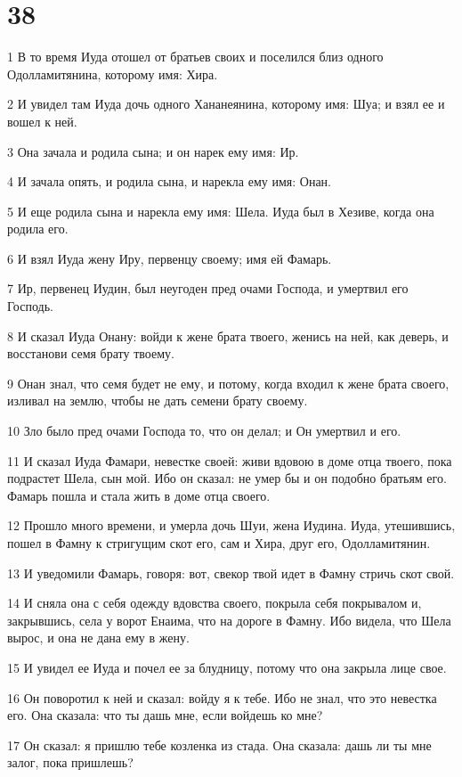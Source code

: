 \chapter{38}

\par 1 В то время Иуда отошел от братьев своих и поселился близ одного Одолламитянина, которому имя: Хира.
\par 2 И увидел там Иуда дочь одного Хананеянина, которому имя: Шуа; и взял ее и вошел к ней.
\par 3 Она зачала и родила сына; и он нарек ему имя: Ир.
\par 4 И зачала опять, и родила сына, и нарекла ему имя: Онан.
\par 5 И еще родила сына и нарекла ему имя: Шела. Иуда был в Хезиве, когда она родила его.
\par 6 И взял Иуда жену Иру, первенцу своему; имя ей Фамарь.
\par 7 Ир, первенец Иудин, был неугоден пред очами Господа, и умертвил его Господь.
\par 8 И сказал Иуда Онану: войди к жене брата твоего, женись на ней, как деверь, и восстанови семя брату твоему.
\par 9 Онан знал, что семя будет не ему, и потому, когда входил к жене брата своего, изливал на землю, чтобы не дать семени брату своему.
\par 10 Зло было пред очами Господа то, что он делал; и Он умертвил и его.
\par 11 И сказал Иуда Фамари, невестке своей: живи вдовою в доме отца твоего, пока подрастет Шела, сын мой. Ибо он сказал: не умер бы и он подобно братьям его. Фамарь пошла и стала жить в доме отца своего.
\par 12 Прошло много времени, и умерла дочь Шуи, жена Иудина. Иуда, утешившись, пошел в Фамну к стригущим скот его, сам и Хира, друг его, Одолламитянин.
\par 13 И уведомили Фамарь, говоря: вот, свекор твой идет в Фамну стричь скот свой.
\par 14 И сняла она с себя одежду вдовства своего, покрыла себя покрывалом и, закрывшись, села у ворот Енаима, что на дороге в Фамну. Ибо видела, что Шела вырос, и она не дана ему в жену.
\par 15 И увидел ее Иуда и почел ее за блудницу, потому что она закрыла лице свое.
\par 16 Он поворотил к ней и сказал: войду я к тебе. Ибо не знал, что это невестка его. Она сказала: что ты дашь мне, если войдешь ко мне?
\par 17 Он сказал: я пришлю тебе козленка из стада. Она сказала: дашь ли ты мне залог, пока пришлешь?

